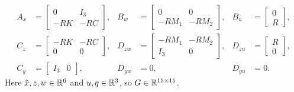 %
{\footnotesize
\setlength{\arraycolsep}{2.5pt}
\begin{equation}
\begin{aligned}
 A_x&=\begin{bmatrix}0&I_3\\-RK&-RC\end{bmatrix},
&B_w&=\begin{bmatrix}0&0\\-RM_1&-RM_2\end{bmatrix},
&B_u&=\begin{bmatrix}0\\R\end{bmatrix},\\
 C_z&=\begin{bmatrix}-RK&-RC\\0&0\end{bmatrix},
&D_{zw}&=\begin{bmatrix}-RM_1&-RM_2\\I_3&0\end{bmatrix},
&D_{zu}&=\begin{bmatrix}R\\0\end{bmatrix},\\
 C_y&=\begin{bmatrix}I_3&0\end{bmatrix},
&D_{yw}&=0,
&D_{yu}&=0.
\end{aligned}
\label{eq:app_lfr_blocks}
\end{equation}
}
Here $\tilde x,z,w\in\mathbb{R}^6$ and $u,q\in\mathbb{R}^3$, so $G\in\mathbb{R}^{15\times15}$.
%

